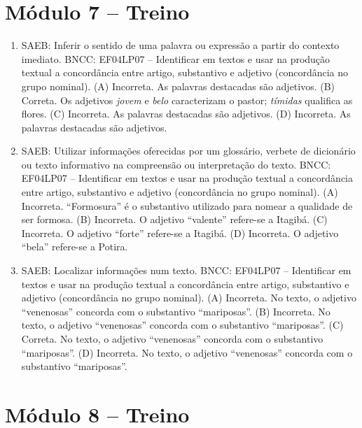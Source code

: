 \section*{Módulo 7 – Treino}

\begin{enumerate}
\item
SAEB: Inferir o sentido de uma palavra ou expressão a partir do
contexto imediato.
BNCC: EF04LP07 -- Identificar em textos e usar na produção textual a
concordância entre artigo, substantivo e adjetivo (concordância no grupo
nominal).
(A)  Incorreta. As palavras destacadas são adjetivos.
(B)  Correta. Os adjetivos \textit{jovem} e \textit{belo} caracterizam o
pastor; \textit{tímidas} qualifica as flores.
(C)  Incorreta. As palavras destacadas são adjetivos.
(D)  Incorreta. As palavras destacadas são adjetivos.

\item
SAEB: Utilizar informações oferecidas por um glossário, verbete de
dicionário ou texto informativo na compreensão ou interpretação do
texto.
BNCC: EF04LP07 -- Identificar em textos e usar na produção textual a
concordância entre artigo, substantivo e adjetivo (concordância no grupo
nominal).
(A) Incorreta. ``Formosura'' é o substantivo utilizado para nomear a qualidade
de ser formosa.
(B) Incorreta. O adjetivo ``valente'' refere-se a Itagibá.
(C)  Incorreta. O adjetivo ``forte'' refere-se a Itagibá.
(D)  Incorreta. O adjetivo ``bela'' refere-se a Potira.

\item
SAEB: Localizar informações num texto.
BNCC: EF04LP07 -- Identificar em textos e usar na produção textual a
concordância entre artigo, substantivo e adjetivo (concordância no grupo
nominal).
(A) Incorreta. No texto, o adjetivo ``venenosas'' concorda com o substantivo ``mariposas''.
(B) Incorreta. No texto, o adjetivo ``venenosas'' concorda com o substantivo ``mariposas''.
(C) Correta. No texto, o adjetivo ``venenosas'' concorda com o substantivo ``mariposas''.
(D) Incorreta. No texto, o adjetivo ``venenosas'' concorda com o substantivo ``mariposas''.
\end{enumerate}

\section*{Módulo 8 – Treino}

